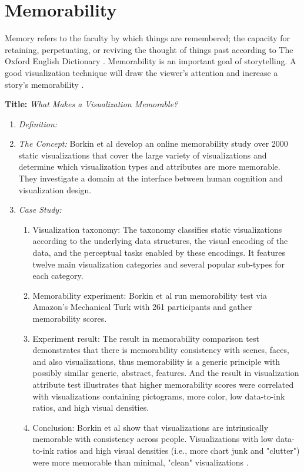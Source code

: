 \documentclass{egpubl}
\begin{document}
\section{Memorability}
Memory refers to the faculty by which things are remembered; the capacity for retaining, perpetuating, or reviving the thought of things past according to The Oxford English Dictionary \cite{memory}. Memorability is an important goal of storytelling. A good visualization technique will draw the viewer's attention and increase a story's memorability \cite{bateman}.

\textbf{Title:} \textit{What Makes a Visualization Memorable?}
\begin{enumerate}
\item \textit{Definition:} 
\item \textit{The Concept:} Borkin et al\cite{borkin2013makes} develop an online memorability study over 2000 static visualizations that cover the large variety of visualizations and determine which visualization types and attributes are more memorable. They investigate a domain at the interface between human cognition and visualization design.
\item \textit{Case Study:} 
\begin{enumerate}
\item Visualization taxonomy: The taxonomy classifies static visualizations according to the underlying data structures, the visual encoding of the data, and the perceptual tasks enabled by these encodings. It features twelve main visualization categories and several popular sub-types for each category.
\item Memorability experiment: Borkin et al run memorability test via Amazon's Mechanical Turk with 261 participants and gather memorability scores.
\item Experiment result: The result in memorability comparison test demonstrates that there is memorability consistency with scenes, faces, and also visualizations, thus memorability is a generic principle with possibly similar generic, abstract, features. And the result in visualization attribute test illustrates that higher memorability scores were correlated with visualizations containing pictograms, more color, low data-to-ink ratios, and high visual densities.
\item Conclusion: Borkin et al show that visualizations are intrinsically memorable with consistency across people. Visualizations with low data-to-ink ratios and high visual densities (i.e., more chart junk and "clutter") were more memorable than minimal, "clean" visualizations \cite{borkin2013makes}. 

\end{enumerate}
\end{enumerate}
\end{document}
